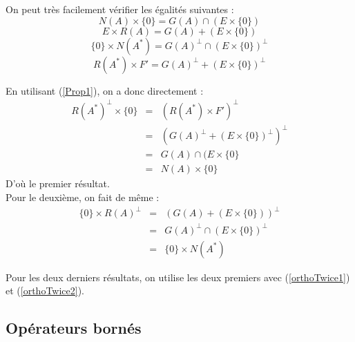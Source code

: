
\begin{dem}
On peut très facilement vérifier les égalités suivantes :
\begin{equation}\label{timesEgal1}N(A)\times\{0\}=G(A)\cap (E\times\{0\})\end{equation}
\begin{equation}\label{timesEgal2} E\times R(A)=G(A)+(E\times\{0\})\end{equation}
\begin{equation}\label{timesEgal3} \{0\}\times N(A^*)=G(A)^\perp\cap(E\times\{0\})^\perp\end{equation}
\begin{equation}\label{timesEgal4} R(A^*)\times F'=G(A)^\perp+(E\times\{0\})^\perp\end{equation}

En utilisant (\ref{Prop1}), on a donc directement :
\begin{eqnarray*} R(A^*)^\perp\times\{0\}&=&(R(A^*)\times F')^\perp\\
					&=&\left(G(A)^\perp+(E\times\{0\})^\perp\right)^\perp\\
					&=&G(A)\cap(E\times\{0\}\\
					&=&N(A)\times \{0\}
\end{eqnarray*}
D'où le premier résultat.\\
Pour le deuxième, on fait de même : 
\begin{eqnarray*}
	\{0\}\times R(A)^\perp&=&\left(G(A)+(E\times\{0\})\right)^\perp\\
				&=&G(A)^\perp\cap(E\times\{0\})^\perp\\
				&=&\{0\}\times N(A^*)
\end{eqnarray*}

Pour les deux derniers résultats, on utilise les deux premiers avec (\ref{orthoTwice1}) et (\ref{orthoTwice2}).
\end{dem}

\subsection{Opérateurs bornés}
